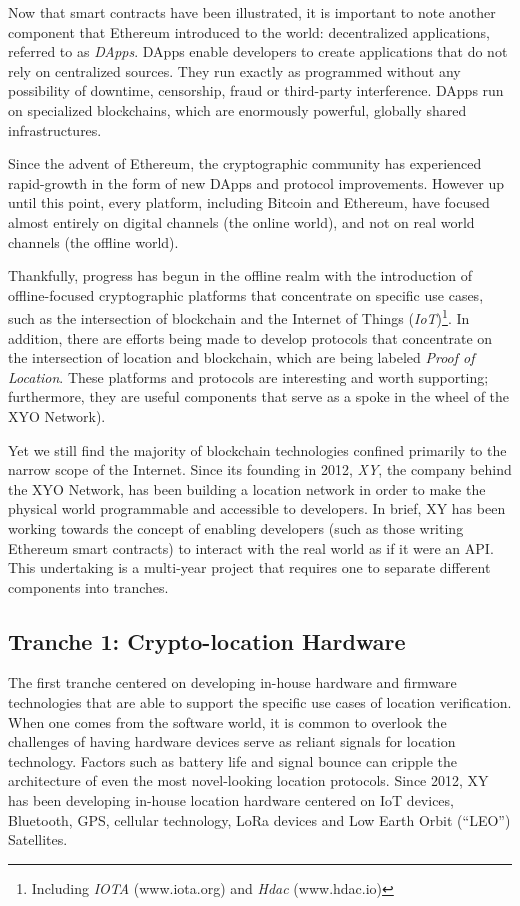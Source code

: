 \documentclass{article}
\begin{document}
Now that smart contracts have been illustrated, it is important to note another component that Ethereum introduced to the world: decentralized applications, referred to as \textit{DApps}. DApps enable developers to create applications that do not rely on centralized sources. They run exactly as programmed without any possibility of downtime, censorship, fraud or third-party interference. DApps run on specialized blockchains, which are enormously powerful, globally shared infrastructures.

Since the advent of Ethereum, the cryptographic community has experienced rapid-growth in the form of new DApps and protocol improvements. However up until this point, every platform, including Bitcoin and Ethereum, have focused almost entirely on digital channels (the online world), and not on real world channels (the offline world).

Thankfully, progress has begun in the offline realm with the introduction of offline-focused cryptographic platforms that concentrate on specific use cases, such as the intersection of blockchain and the Internet of Things (\textit{IoT})\footnote{Including \textit{IOTA} (www.iota.org) and \textit{Hdac} (www.hdac.io)}. In addition, there are efforts being made to develop protocols that concentrate on the intersection of location and blockchain, which are being labeled \textit{Proof of Location}. These platforms and protocols are interesting and worth supporting; furthermore, they are useful components that serve as a spoke in the wheel of the XYO Network).

Yet we still find the majority of blockchain technologies confined primarily to the narrow scope of the Internet. Since its founding in 2012, \textit{XY}, the company behind the XYO Network, has been building a location network in order to make the physical world programmable and accessible to developers. In brief, XY has been working towards the concept of enabling developers (such as those writing Ethereum smart contracts) to interact with the real world as if it were an API. This undertaking is a multi-year project that requires one to separate different components into tranches. 

\subsection{Tranche 1: Crypto-location Hardware}
The first tranche centered on developing in-house hardware and firmware technologies that are able to support the specific use cases of location verification. When one comes from the software world, it is common to overlook the challenges of having hardware devices serve as reliant signals for location technology. Factors such as battery life and signal bounce can cripple the architecture of even the most novel-looking location protocols. Since 2012, XY has been developing in-house location hardware centered on IoT devices, Bluetooth, GPS, cellular technology, LoRa devices and Low Earth Orbit (``LEO'') Satellites.
\end{document}
